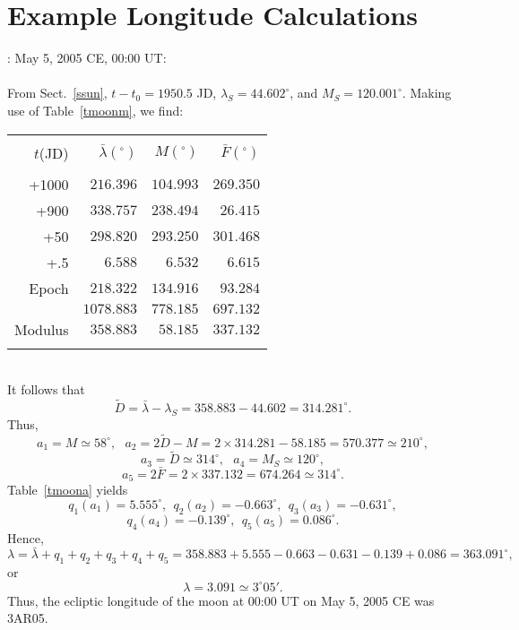 \section{Example Longitude Calculations}
: May 5, 2005 CE, 00:00 UT:\\
~\\
From Sect.~\ref{ssun}, $t-t_0=1950.5$ JD, $\lambda_S = 44.602^\circ$, and $M_S= 120.001^\circ$. 
Making use of Table~\ref{tmoonm}, we find:\\
\begin{tabular}{rrrr}
&&&\\
$t$(JD) & $ \bar{\lambda}(^\circ)$ & $M(^\circ)$ & $\bar{F}(^\circ)$\\[-2ex]
&&&\\
+1000 & $216.396$ & $104.993$ & $269.350$\\
+900 & $338.757$ & $238.494$ & $26.415$\\
+50 & $298.820$ & $293.250$ & $301.468$\\
+.5 & $6.588$ & $6.532$ & $6.615$\\
Epoch & $218.322$ & $134.916$ & $93.284$\\\cline{2-4}
&$1078.883$ & $778.185$ & $697.132$\\\cline{2-4}
Modulus & $358.883$ & $58.185$ &$337.132$\\ 
&&&\\
\end{tabular}\\
It follows that 
$$
\tilde{D}=\bar{\lambda}-\lambda_S = 358.883-44.602 = 314.281^\circ.
$$
Thus, 
$$
a_1=M\simeq 58^\circ,~~~a_2=2\tilde{D}-M = 2\times 314.281-58.185=570.377\simeq 210^\circ,
$$ 
$$
a_3=\tilde{D}\simeq 314^\circ,~~~a_4 = M_S\simeq 120^\circ,
$$ 
$$
a_5=2\bar{F} = 2\times 337.132=674.264\simeq 314^\circ.
$$
Table~\ref{tmoona} yields $$
q_1(a_1)=5.555^\circ,~~q_2(a_2)= -0.663^\circ,~~q_3(a_3) = -0.631^\circ,
$$
$$q_4(a_4)=-0.139^\circ,~~q_5(a_5)= 0.086^\circ.
$$
 Hence,
$$
\lambda = \bar{\lambda} + q_1+q_2+q_3+q_4+q_5=358.883+5.555-0.663-0.631-0.139+0.086=
363.091^\circ,
$$
or 
$$
\lambda =3.091\simeq 3^\circ 05'.
$$
Thus, the ecliptic longitude of the moon at 00:00 UT on May 5, 2005 CE was 3AR05.

